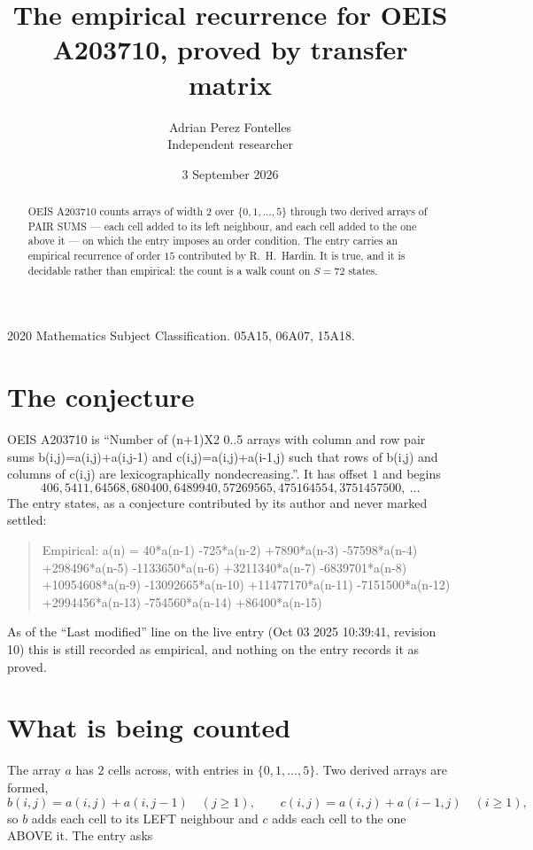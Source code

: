 \documentclass[11pt,a4paper]{article}
\title{The empirical recurrence for OEIS A203710, proved by transfer matrix}
\author{Adrian Perez Fontelles\\ \small Independent researcher}
\date{3 September 2026}
\theoremstyle{plain}
\theoremstyle{definition}
\begin{document}
\maketitle

\begin{abstract}
OEIS A203710 counts arrays of width $2$ over $\{0,1,\dots,5\}$ through two derived arrays of PAIR SUMS ---
each cell added to its left neighbour, and each cell added to the one above it --- on which the
entry imposes an order condition. The entry carries an empirical recurrence of order $15$
contributed by R.~H.~Hardin. It is true, and it is decidable rather than empirical: the count is
a walk count on $S=72$ states.
\end{abstract}

\noindent\small 2020 Mathematics Subject Classification. 05A15, 06A07, 15A18.\normalsize

\section{The conjecture}

OEIS A203710 is ``Number of (n+1)X2 0..5 arrays with column and row pair sums b(i,j)=a(i,j)+a(i,j-1) and c(i,j)=a(i,j)+a(i-1,j) such that rows of b(i,j) and columns of c(i,j) are lexicographically nondecreasing.''. It has offset $1$ and begins
\[
406, 5411, 64568, 680400, 6489940, 57269565, 475164554, 3751457500,\ \dots
\]
The entry states, as a conjecture contributed by its author and never marked settled:
\begin{quote}
Empirical: a(n) = 40*a(n-1) -725*a(n-2) +7890*a(n-3) -57598*a(n-4) +298496*a(n-5) -1133650*a(n-6) +3211340*a(n-7) -6839701*a(n-8) +10954608*a(n-9) -13092665*a(n-10) +11477170*a(n-11) -7151500*a(n-12) +2994456*a(n-13) -754560*a(n-14) +86400*a(n-15)
\end{quote}
As of the ``Last modified'' line on the live entry (Oct 03 2025 10:39:41, revision 10) this is still
recorded as empirical, and nothing on the entry records it as proved.

\section{What is being counted}

The array $a$ has $2$ cells across, with entries in $\{0,1,\dots,5\}$. Two derived arrays are formed,
\[
b(i,j)=a(i,j)+a(i,j-1)\quad(j\ge1),\qquad c(i,j)=a(i,j)+a(i-1,j)\quad(i\ge1),
\]
so $b$ adds each cell to its LEFT neighbour and $c$ adds each cell to the one ABOVE it. The
entry asks
\end{document}

